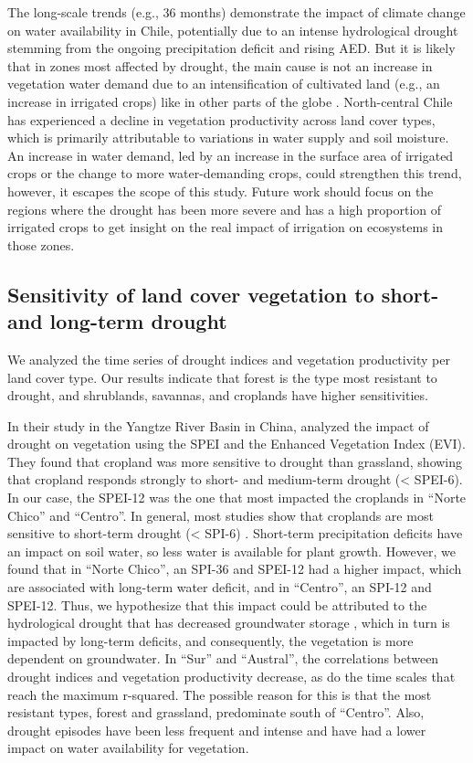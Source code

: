 \documentclass[
  authoryear,
  preprint,
  3p,
  onecolumn]{elsarticle}
\begin{document}
The long-scale trends (e.g., 36 months) demonstrate the impact of
climate change on water availability in Chile, potentially due to an
intense hydrological drought stemming from the ongoing precipitation
deficit and rising AED. But it is likely that in zones most affected by
drought, the main cause is not an increase in vegetation water demand
due to an intensification of cultivated land (e.g., an increase in
irrigated crops) like in other parts of the globe
\citep{Vicente-Serrano2020}. North-central Chile has experienced a
decline in vegetation productivity across land cover types, which is
primarily attributable to variations in water supply and soil moisture.
An increase in water demand, led by an increase in the surface area of
irrigated crops or the change to more water-demanding crops, could
strengthen this trend, however, it escapes the scope of this study.
Future work should focus on the regions where the drought has been more
severe and has a high proportion of irrigated crops to get insight on
the real impact of irrigation on ecosystems in those zones.

\subsection{Sensitivity of land cover vegetation to short- and long-term
drought}\label{sensitivity-of-land-cover-vegetation-to-short--and-long-term-drought}

We analyzed the time series of drought indices and vegetation
productivity per land cover type. Our results indicate that forest is
the type most resistant to drought, and shrublands, savannas, and
croplands have higher sensitivities.

In their study in the Yangtze River Basin in China, \citet{Jiang2020}
analyzed the impact of drought on vegetation using the SPEI and the
Enhanced Vegetation Index (EVI). They found that cropland was more
sensitive to drought than grassland, showing that cropland responds
strongly to short- and medium-term drought (\textless{} SPEI-6). In our
case, the SPEI-12 was the one that most impacted the croplands in
``Norte Chico'' and ``Centro''. In general, most studies show that
croplands are most sensitive to short-term drought (\textless{} SPI-6)
\citep{Zambrano2016, Potopova2015, Dai2020, Rhee2010}. Short-term
precipitation deficits have an impact on soil water, so less water is
available for plant growth. However, we found that in ``Norte Chico'',
an SPI-36 and SPEI-12 had a higher impact, which are associated with
long-term water deficit, and in ``Centro'', an SPI-12 and SPEI-12. Thus,
we hypothesize that this impact could be attributed to the hydrological
drought that has decreased groundwater storage \citep{Taucare2024},
which in turn is impacted by long-term deficits, and consequently, the
vegetation is more dependent on groundwater. In ``Sur'' and ``Austral'',
the correlations between drought indices and vegetation productivity
decrease, as do the time scales that reach the maximum r-squared. The
possible reason for this is that the most resistant types, forest and
grassland, predominate south of ``Centro''. Also, drought episodes have
been less frequent and intense and have had a lower impact on water
availability for vegetation.
\end{document}
